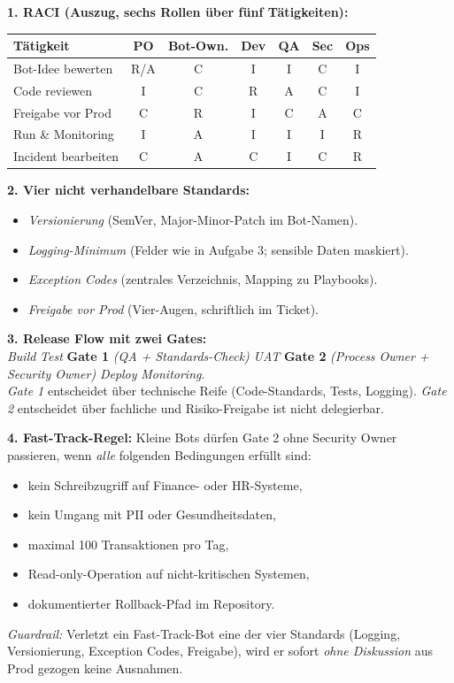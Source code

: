 \documentclass[11pt,a4paper,oneside]{article}
\begin{document}
\begin{loesungbox}
\textbf{1. RACI (Auszug, sechs Rollen \"uber f\"unf T\"atigkeiten):}

\smallskip
\begin{tabularx}{\linewidth}{@{}p{3.9cm}cccccc@{}}
\toprule
\textbf{T\"atigkeit} & \textbf{PO} & \textbf{Bot-Own.} & \textbf{Dev} & \textbf{QA} & \textbf{Sec} & \textbf{Ops} \\
\midrule
Bot-Idee bewerten     & R/A & C   & I   & I   & C   & I   \\
Code reviewen         & I   & C   & R   & A   & C   & I   \\
Freigabe vor Prod     & C   & R   & I   & C   & A   & C   \\
Run \& Monitoring     & I   & A   & I   & I   & I   & R   \\
Incident bearbeiten   & C   & A   & C   & I   & C   & R   \\
\bottomrule
\end{tabularx}

\smallskip
\textbf{2. Vier nicht verhandelbare Standards:}
\begin{itemize}
  \item \emph{Versionierung} (SemVer, Major-Minor-Patch im Bot-Namen).
  \item \emph{Logging-Minimum} (Felder wie in Aufgabe 3; sensible Daten maskiert).
  \item \emph{Exception Codes} (zentrales Verzeichnis, Mapping zu Playbooks).
  \item \emph{Freigabe vor Prod} (Vier-Augen, schriftlich im Ticket).
\end{itemize}

\smallskip
\textbf{3. Release Flow mit zwei Gates:}\\
\emph{Build} \textrightarrow{} \emph{Test} \textrightarrow{} \textbf{Gate 1} \emph{(QA + Standards-Check)} \textrightarrow{} \emph{UAT} \textrightarrow{} \textbf{Gate 2} \emph{(Process Owner + Security Owner)} \textrightarrow{} \emph{Deploy} \textrightarrow{} \emph{Monitoring}.\\
\emph{Gate 1} entscheidet \"uber technische Reife (Code-Standards, Tests, Logging). \emph{Gate 2} entscheidet \"uber fachliche und Risiko-Freigabe \textendash{} ist nicht delegierbar.

\smallskip
\textbf{4. Fast-Track-Regel:} Kleine Bots d\"urfen Gate 2 ohne Security Owner passieren, wenn \emph{alle} folgenden Bedingungen erf\"ullt sind:
\begin{itemize}
  \item kein Schreibzugriff auf Finance- oder HR-Systeme,
  \item kein Umgang mit PII oder Gesundheitsdaten,
  \item maximal 100 Transaktionen pro Tag,
  \item Read-only-Operation auf nicht-kritischen Systemen,
  \item dokumentierter Rollback-Pfad im Repository.
\end{itemize}
\emph{Guardrail:} Verletzt ein Fast-Track-Bot eine der vier Standards (Logging, Versionierung, Exception Codes, Freigabe), wird er sofort \emph{ohne Diskussion} aus Prod gezogen \textendash{} keine Ausnahmen.


\end{loesungbox}
\end{document}
